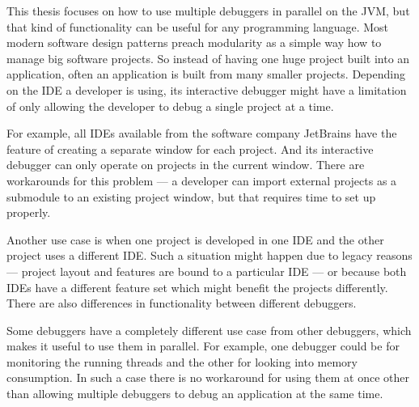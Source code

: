 \documentclass[..thesis.tex]{subfiles}
\begin{document}
This thesis focuses on how to use multiple debuggers in parallel on the JVM, but that kind of functionality can be useful for any programming language. 
Most modern software design patterns preach modularity as a simple way how to manage big software projects.
So instead of having one huge project built into an application, often an application is built from many smaller projects.
Depending on the IDE a developer is using, its interactive debugger might have a limitation of only allowing the developer to debug a single project at a time.

For example, all IDEs available from the software company JetBrains have the feature of creating a separate window for each project.
And its interactive debugger can only operate on projects in the current window.
There are workarounds for this problem --- a developer can import external projects as a submodule to an existing project window, but that requires time to set up properly.

Another use case is when one project is developed in one IDE and the other project uses a different IDE.
Such a situation might happen due to legacy reasons --- project layout and features are bound to a particular IDE --- or because both IDEs have a different feature set which might benefit the projects differently.
There are also differences in functionality between different debuggers. 

Some debuggers have a completely different use case from other debuggers, which makes it useful to use them in parallel.
For example, one debugger could be for monitoring the running threads and the other for looking into memory consumption.
In such a case there is no workaround for using them at once other than allowing multiple debuggers to debug an application at the same time.
% 
% 
\end{document}
